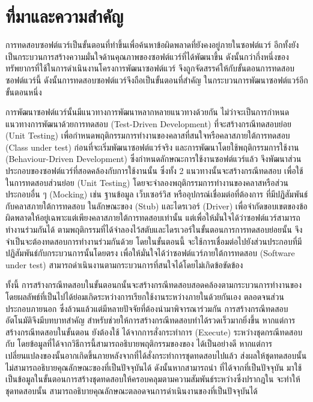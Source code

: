 \section{ที่มาและความสำคัญ} 
\label{sec:introduction}

การทดสอบซอฟต์แวร์เป็นขั้นตอนที่ทำขึ้นเพื่อค้นหาข้อผิดพลาดที่ยังคงอยู่ภายในซอฟต์แวร์ \cite{Myers:2011:AST:983238}
อีกทั้งยังเป็นกระบวนการสร้างความมั่นใจด้านคุณภาพของซอฟต์แวร์ที่ได้พัฒนาขึ้น ดังนั้นกว่ากึ่งหนึ่งของทรัพยากรที่ใช้ในการดำเนินงานโครงการพัฒนาซอฟต์แวร์
จึงถูกจัดสรรค์ให้กับขั้นตอนการทดสอบซอฟต์แวร์นี้ \cite{Jackson2007, Tassey2002} ดังนั้นการทดสอบซอฟต์แวร์จึงถือเป็นขั้นตอนที่สำคัญ
ในกระบวนการพัฒนาซอฟต์แวร์อีกขั้นตอนหนึ่ง

การพัฒนาซอฟต์แวร์นั้นมีแนวทางการพัฒนาหลากหลายแนวทางด้วยกัน ไม่ว่าจะเป็นการกำหนดแนวทางการพัฒนาด้วยการทดสอบ (Test-Driven Development) 
ที่จะสร้างกรณีทดสอบย่อย (Unit Testing) เพื่อกำหนดพฤติกรรมการทำงานของคลาสที่สนใจหรือคลาสภายใต้การทดสอบ (Class under test) 
ก่อนที่จะเริ่มพัฒนาซอฟต์แวร์จริง \cite{Markovi2012} และการพัฒนาโดยใช้พฤติกรรมการใช้งาน (Behaviour-Driven Development) 
ซึ่งกำหนดลักษณะการใช้งานซอฟต์แวร์แล้ว จึงพัฒนาส่วนประกอบของซอฟต์แวร์ที่สอดคล้องกับการใช้งานนั้น \cite{Lazar2010}
ซึ่งทั้ง 2 แนวทางนั้นจะสร้างกรณีทดสอบ เพื่อใช้ในการทดสอบส่วนย่อย (Unit Testing) โดยจะจำลองพฤติกรรมการทำงานของคลาสหรือส่วนประกอบอื่น ๆ
(Mocking) เช่น ฐานข้อมูล เว็บเซอร์วิส หรืออุปกรณ์เชื่อมต่อที่ต้องการ ที่มีปฏิสัมพันธ์กับคลาสภายใต้การทดสอบ ในลักษณะของ (Stub) และไดรเวอร์ (Driver)
เพื่อจำกัดขอบเขตของข้อผิดพลาดให้อยู่เฉพาะแต่เพียงคลาสภายใต้การทดสอบเท่านั้น แต่เพื่อให้มั่นใจได้ว่าซอฟต์แวร์สามารถทำงานร่วมกันได้ 
ตามพฤติกรรมที่ได้จำลองไว้สตับและไดรเวอร์ในขั้นตอนการการทดสอบย่อยนั้น 
จึงจำเป็นจะต้องทดสอบการทำงานร่วมกันด้วย\FirstTimeDefine{\IntegrationTesting}{\IntegrationTestingEN}
โดยในขั้นตอนนี้ จะใช้การเชื่อมต่อไปยังส่วนประกอบที่มีปฏิสัมพันธ์กับกระบวนการนั้นโดยตรง เพื่อให้มั่นใจได้ว่าซอฟต์แวร์ภายใต้การทดสอบ (Software under test) 
สามารถดำเนินงานตามกระบวนการที่สนใจได้โดยไม่เกิดข้อขัดข้อง

ทั้งนี้ การสร้างกรณีทดสอบในขั้นตอนก{\IntegrationTesting}นั้นจะสร้างกรณีทดสอบสอดคล้องตามกระบวนการทำงานของ\FirstTimeDefine{\SUT}{\SUTEN} 
โดยผลลัพธ์ที่เป็นไปได้ย่อมเกิดระหว่างการเรียกใช้งานระหว่าง{\softwareComponent}ภายใน{\SUT}ด้วยกันเอง ตลอดจนส่วนประกอบภายนอก 
ซึ่งล้วนแล้วแต่มีหลายปัจจัยที่ต้องนำมาพิจารณาร่วมกัน การสร้างกรณีทดสอบอัตโนมัติจึงมีบทบาทสำคัญ สำหรับช่วยให้การสร้างกรณีทดสอบทำได้รวดเร็วมากยิ่งขึ้น 
หากแต่การสร้างกรณีทดสอบในขั้นตอน{\IntegrationTesting} ยังต้องใช้\FirstTimeDefine{\DynamicInformation}{\DynamicInformationEN}
ได้จากการสั่งกระทำการ (Execute) ระหว่างชุดกรณีทดสอบกับ{\sourcecode} โดยข้อมูลที่ได้จากวิธีการนี้สามารถอธิบายพฤติกรรมของ{\SUT}ของ{\sourcecode}
ได้เป็นอย่างดี หากแต่การเปลี่ยนแปลงของ{\sourcecode}นั้นอากเกิดขึ้นภายหลังจากที่ได้สั่งกระทำการชุดทดสอบไปแล้ว 
ส่งผลให้ชุดทดสอบนั้นไม่สามารถอธิบายคุณลักษณะของ{\sourcecode}ที่เป็นปัจจุบันได้ ดังนั้นหากสามารถนำ\FirstTimeDefine{\StaticInformation}{\StaticInformationEN}
ที่ได้จาก{\sourcecode}ที่เป็นปัจจุบัน มาใช้เป็นข้อมูลในขั้นตอนการสร้างชุดทดสอบให้ครอบคลุมตามความสัมพันธ์ระหว่าง{\softwareComponent}ซึ่งปรากฎใน{\SUT} 
จะทำให้ชุดทดสอบนั้น สามารถอธิบายคุณลักษณะตลอดจนการดำเนินงานของ{\SUT}ที่เป็นปัจจุบันได้

